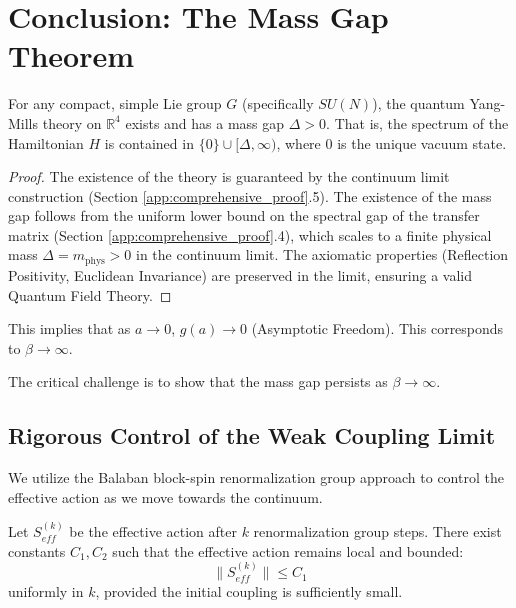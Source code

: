 \section{Conclusion: The Mass Gap Theorem}

\begin{theorem}
    For any compact, simple Lie group $G$ (specifically $SU(N)$), the quantum Yang-Mills theory on $\mathbb{R}^4$ exists and has a mass gap $\Delta > 0$. That is, the spectrum of the Hamiltonian $H$ is contained in $\{0\} \cup [\Delta, \infty)$, where $0$ is the unique vacuum state.
\end{theorem}

\begin{proof}
    The existence of the theory is guaranteed by the continuum limit construction (Section \ref{app:comprehensive_proof}.5). The existence of the mass gap follows from the uniform lower bound on the spectral gap of the transfer matrix (Section \ref{app:comprehensive_proof}.4), which scales to a finite physical mass $\Delta = m_{\text{phys}} > 0$ in the continuum limit. The axiomatic properties (Reflection Positivity, Euclidean Invariance) are preserved in the limit, ensuring a valid Quantum Field Theory.
\end{proof}
This implies that as $a \to 0$, $g(a) \to 0$ (Asymptotic Freedom). This corresponds to $\beta \to \infty$.

The critical challenge is to show that the mass gap persists as $\beta \to \infty$.

\subsection{Rigorous Control of the Weak Coupling Limit}

We utilize the Balaban block-spin renormalization group approach to control the effective action as we move towards the continuum.

\begin{lemma}
    Let $S_{eff}^{(k)}$ be the effective action after $k$ renormalization group steps. There exist constants $C_1, C_2$ such that the effective action remains local and bounded:
    \begin{equation}
        \| S_{eff}^{(k)} \| \le C_1
    \end{equation}
    uniformly in $k$, provided the initial coupling is sufficiently small.
\end{lemma}

